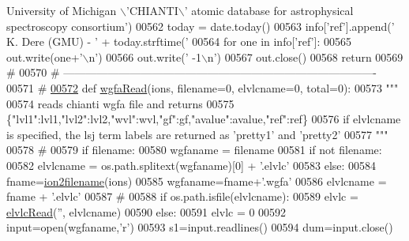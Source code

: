 \begin{DoxyCode}
{{{{{{{{{       University of Michigan \(\backslash\)'CHIANTI\(\backslash\)' atomic database for astrophysical spectroscopy consortium'})
00562     today = date.today()
00563     info[\textcolor{stringliteral}{'ref'}].append(\textcolor{stringliteral}{' K. Dere (GMU) - '} + today.strftime(\textcolor{stringliteral}{'%
00564     \textcolor{keywordflow}{for} one \textcolor{keywordflow}{in} info[\textcolor{stringliteral}{'ref'}]:
00565         out.write(one+\textcolor{stringliteral}{'\(\backslash\)n'})
00566     out.write(\textcolor{stringliteral}{' -1\(\backslash\)n'})
00567     out.close()
00568     \textcolor{keywordflow}{return}
00569     \textcolor{comment}{#}
00570     \textcolor{comment}{# -------------------------------------------------------------------------------------}
00571     \textcolor{comment}{#}
\hypertarget{__chianti__tools_8py_source_l00572}{}\hyperlink{namespacepyneb_1_1utils_1_1__chianti__tools_a3ef36a1d0a4df4cab94a392d2a3da980}{00572} \textcolor{keyword}{def }\hyperlink{namespacepyneb_1_1utils_1_1__chianti__tools_a3ef36a1d0a4df4cab94a392d2a3da980}{wgfaRead}(ions, filename=0, elvlcname=0, total=0):
00573     \textcolor{stringliteral}{"""}
00574 \textcolor{stringliteral}{    reads chianti wgfa file and returns}
00575 \textcolor{stringliteral}{    \{"lvl1":lvl1,"lvl2":lvl2,"wvl":wvl,"gf":gf,"avalue":avalue,"ref":ref\}}
00576 \textcolor{stringliteral}{    if elvlcname is specified, the lsj term labels are returned as 'pretty1' and 'pretty2'}
00577 \textcolor{stringliteral}{    """}
00578     \textcolor{comment}{#}
00579     \textcolor{keywordflow}{if} filename:
00580         wgfaname = filename
00581         \textcolor{keywordflow}{if} \textcolor{keywordflow}{not} filename:
00582             elvlcname = os.path.splitext(wgfaname)[0] + \textcolor{stringliteral}{'.elvlc'}
00583     \textcolor{keywordflow}{else}:
00584         fname=\hyperlink{namespacepyneb_1_1utils_1_1__chianti__tools_ad4bc7b577fd4c3819ceb00b0a444351b}{ion2filename}(ions)
00585         wgfaname=fname+\textcolor{stringliteral}{'.wgfa'}
00586         elvlcname = fname + \textcolor{stringliteral}{'.elvlc'}
00587     \textcolor{comment}{#}
00588     \textcolor{keywordflow}{if} os.path.isfile(elvlcname):
00589         elvlc = \hyperlink{namespacepyneb_1_1utils_1_1__chianti__tools_ac848d0b5ea14bf4adf6e8cd5d46fb639}{elvlcRead}(\textcolor{stringliteral}{''}, elvlcname)
00590     \textcolor{keywordflow}{else}:
00591         elvlc = 0
00592     input=open(wgfaname,\textcolor{stringliteral}{'}\textcolor{stringliteral}{r')}
00593 \textcolor{stringliteral}{    s1=input.readlines()}
00594 \textcolor{stringliteral}{    dum=input.close()}
}}}}}}}}}
\end{DoxyCode}
